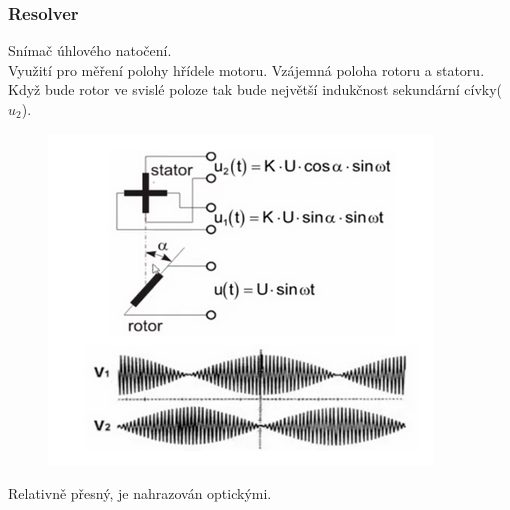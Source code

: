\subsubsection{Resolver}
Snímač úhlového natočení.\\
Využití pro měření polohy hřídele motoru. Vzájemná poloha rotoru a statoru. Když bude rotor ve svislé poloze tak bude největší indukčnost sekundární cívky(\(u_2\)).\\
\begin{figure}[h!]
    \centering
    \includegraphics[scale = 0.5]{img/Resolver.png}
\end{figure}
Relativně přesný, je nahrazován optickými.\\

